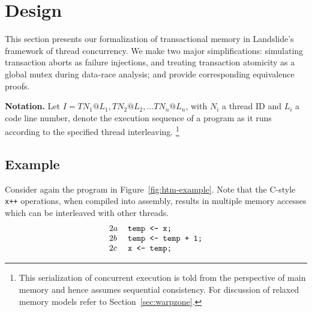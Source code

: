 \documentclass[10pt]{sigplanconf}
\begin{document}
\section{Design}
\label{sec:design}

This section presents our formalization of transactional memory in Landslide's framework of thread concurrency.
We make two major simplifications:
simulating transaction aborts as failure injections,
and treating transaction atomicity as a global mutex during data-race analysis;
and provide corresponding equivalence proofs.

{\bf Notation.} Let $I = TN_1@L_1, TN_2@L_2, ... TN_n@L_n$,
with $N_i$ a thread ID and $L_i$ a code line number,
denote the execution sequence of a program as it runs according to the specified thread interleaving.%
\footnote{This serialization of concurrent execution is told from the perspective of main memory
and hence assumes sequential consistency.
For discussion of relaxed memory models refer to Section~\ref{sec:warpzone}.}

\subsection{Example}

Consider again the program in Figure~\ref{fig:htm-example}.
Note that the C-style {\tt x++} operations, when compiled into assembly,
results in multiple memory accesses which can be interleaved with other threads.
\[
\begin{tabular}{ll}
	$2a$ & \texttt{temp <- x;} \\
	$2b$ & \texttt{temp <- temp + 1;} \\
	$2c$ & \texttt{x <- temp;} \\
\end{tabular}
\]

\newcommand\hilight[2]{\color{#1}#2\color{black}}


\newcommand\ti{\ensuremath{\hilight{lavender}{\mathbf{T1}}}\xspace}
\newcommand\tj{\ensuremath{\hilight{seafoam}{\mathbf{T2}}}\xspace}
\newcommand\tk{\ensuremath{\hilight{salmon}{\mathbf{T3}}}\xspace}
\end{document}
